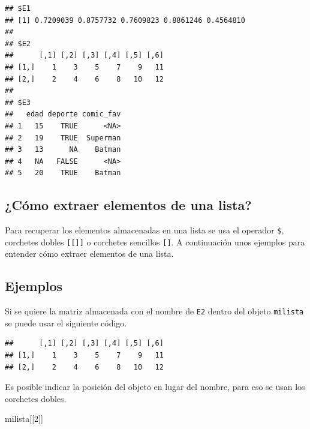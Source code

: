 \documentclass[
]{book}
\newenvironment{Shaded}{\begin{snugshade}}{\end{snugshade}}
\newcommand{\DecValTok}[1]{\textcolor[rgb]{0.00,0.00,0.81}{#1}}
\newcommand{\NormalTok}[1]{#1}
\newcommand{\SpecialCharTok}[1]{\textcolor[rgb]{0.00,0.00,0.00}{#1}}
\begin{document}
\begin{verbatim}
## $E1
## [1] 0.7209039 0.8757732 0.7609823 0.8861246 0.4564810
## 
## $E2
##      [,1] [,2] [,3] [,4] [,5] [,6]
## [1,]    1    3    5    7    9   11
## [2,]    2    4    6    8   10   12
## 
## $E3
##   edad deporte comic_fav
## 1   15    TRUE      <NA>
## 2   19    TRUE  Superman
## 3   13      NA    Batman
## 4   NA   FALSE      <NA>
## 5   20    TRUE    Batman
\end{verbatim}

\hypertarget{cuxf3mo-extraer-elementos-de-una-lista}{%
\subsection{¿Cómo extraer elementos de una lista?}\label{cuxf3mo-extraer-elementos-de-una-lista}}

Para recuperar los elementos almacenadas en una lista se usa el operador \texttt{\$}, corchetes dobles \texttt{{[}{[}{]}{]}} o corchetes sencillos \texttt{{[}{]}}. A continuación unos ejemplos para entender cómo extraer elementos de una lista.

\hypertarget{ejemplos-1}{%
\subsection*{Ejemplos}\label{ejemplos-1}}

Si se quiere la matriz almacenada con el nombre de \texttt{E2} dentro del objeto \texttt{milista} se puede usar el siguiente código.

\begin{Shaded}
\end{Shaded}

\begin{verbatim}
##      [,1] [,2] [,3] [,4] [,5] [,6]
## [1,]    1    3    5    7    9   11
## [2,]    2    4    6    8   10   12
\end{verbatim}

Es posible indicar la posición del objeto en lugar del nombre, para eso se usan los corchetes dobles.

\begin{Shaded}
\begin{Highlighting}[]
\NormalTok{milista[[}\DecValTok{2}\NormalTok{]]}
\end{Highlighting}
\end{Shaded}
\end{document}
